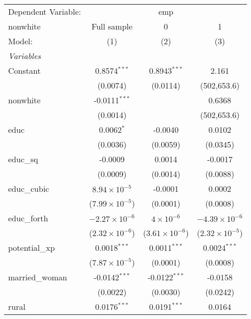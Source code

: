 \begingroup
\centering
\begin{tabular}{lccc}
   \tabularnewline \midrule \midrule
   Dependent Variable: & \multicolumn{3}{c}{emp}\\
   nonwhite        & Full sample             & 0                       & 1 \\   
   Model:          & (1)                     & (2)                     & (3)\\  
   \midrule
   \emph{Variables}\\
   Constant        & 0.8574$^{***}$          & 0.8943$^{***}$          & 2.161\\   
                   & (0.0074)                & (0.0114)                & (502,653.6)\\   
   nonwhite        & -0.0111$^{***}$         &                         & 0.6368\\   
                   & (0.0014)                &                         & (502,653.6)\\   
   educ            & 0.0062$^{*}$            & -0.0040                 & 0.0102\\   
                   & (0.0036)                & (0.0059)                & (0.0345)\\   
   educ\_sq        & -0.0009                 & 0.0014                  & -0.0017\\   
                   & (0.0009)                & (0.0014)                & (0.0088)\\   
   educ\_cubic     & $8.94\times 10^{-5}$    & -0.0001                 & 0.0002\\   
                   & ($7.99\times 10^{-5}$)  & (0.0001)                & (0.0008)\\   
   educ\_forth     & $-2.27\times 10^{-6}$   & $4\times 10^{-6}$       & $-4.39\times 10^{-6}$\\    
                   & ($2.32\times 10^{-6}$)  & ($3.61\times 10^{-6}$)  & ($2.32\times 10^{-5}$)\\    
   potential\_xp   & 0.0018$^{***}$          & 0.0011$^{***}$          & 0.0024$^{***}$\\   
                   & ($7.87\times 10^{-5}$)  & (0.0001)                & (0.0008)\\   
   married\_woman  & -0.0142$^{***}$         & -0.0122$^{***}$         & -0.0158\\   
                   & (0.0022)                & (0.0030)                & (0.0242)\\   
   rural           & 0.0176$^{***}$          & 0.0191$^{***}$          & 0.0164\\   

\end{tabular}
